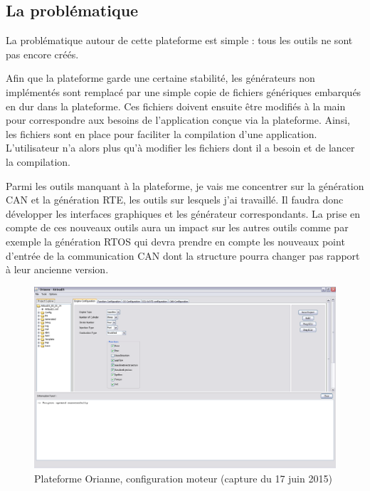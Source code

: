 \subsection{La problématique}
La problématique autour de cette plateforme est simple : tous les outils ne sont pas encore créés.

Afin que la plateforme garde une certaine stabilité, les générateurs non implémentés sont remplacé par une simple copie de fichiers génériques embarqués en dur dans la plateforme. Ces fichiers doivent ensuite être modifiés à la main pour correspondre aux besoins de l'application conçue via la plateforme. Ainsi, les fichiers sont en place pour faciliter la compilation d'une application. L'utilisateur n'a alors plus qu'à modifier les fichiers dont il a besoin et de lancer la compilation.

Parmi les outils manquant à la plateforme, je vais me concentrer sur la génération CAN et la génération RTE, les outils sur lesquels j'ai travaillé. Il faudra donc développer les interfaces graphiques et les générateur correspondants. La prise en compte de ces nouveaux outils aura un impact sur les autres outils comme par exemple la génération RTOS qui devra prendre en compte les nouveaux point d'entrée de la communication CAN dont la structure pourra changer pas rapport à leur ancienne version.

\begin{figure}[h]
  \centering
  \includegraphics[angle=-90, scale=0.5]{images/plateforme}
  \caption{Plateforme Orianne, configuration moteur (capture du 17 juin 2015)}
  \label{fig:plateforme}
\end{figure}

